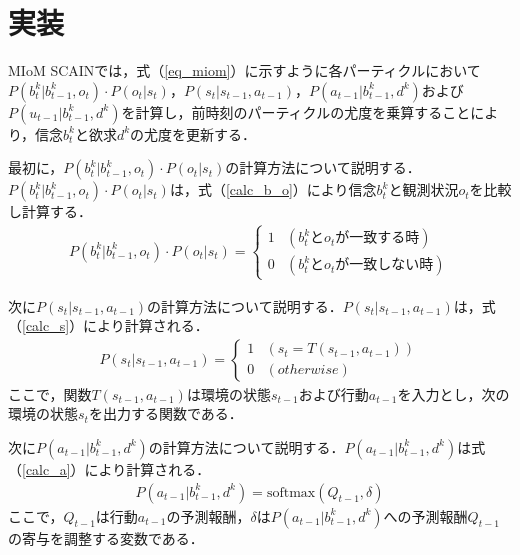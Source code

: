 \section{実装}
\par
MIoM SCAINでは，式（\ref{eq_miom}）に示すように各パーティクルにおいて$P(b_t^k|b_{t-1}^k,o_t)\cdot P(o_t|s_t)$，$P(s_t|s_{t-1},a_{t-1})$，$P(a_{t-1}|b_{t-1}^k,d^k)$および$P(u_{t-1}|b_{t-1}^k,d^k)$を計算し，前時刻のパーティクルの尤度を乗算することにより，信念$b_t^k$と欲求$d^k$の尤度を更新する．

\par
最初に，$P(b_t^k|b_{t-1}^k,o_t)\cdot P(o_t|s_t)$の計算方法について説明する．$P(b_t^k|b_{t-1}^k,o_t)\cdot P(o_t|s_t)$は，式（\ref{calc_b_o}）により信念$b_t^k$と観測状況$o_t$を比較し計算する．
\begin{equation}
  \begin{split}
  \label{calc_b_o}
  P(b_t^k|b_{t-1}^k,o_t)\cdot P(o_t|s_t)=
  \begin{cases}
    1 & (b_t^kとo_tが一致する時) \\
    0 & (b_t^kとo_tが一致しない時)
  \end{cases}
  \end{split}
\end{equation}

\par
次に$P(s_t|s_{t-1},a_{t-1})$の計算方法について説明する．$P(s_t|s_{t-1},a_{t-1})$は，式（\ref{calc_s}）により計算される．
\begin{equation}
  \begin{split}
  \label{calc_s}
  P(s_t|s_{t-1},a_{t-1})=
  \begin{cases}
    1 & (s_t=T(s_{t-1},a_{t-1})) \\
    0 & (otherwise)
  \end{cases}
  \end{split}
\end{equation}
ここで，関数$T(s_{t-1},a_{t-1})$は環境の状態$s_{t-1}$および行動$a_{t-1}$を入力とし，次の環境の状態$s_t$を出力する関数である．

\par
次に$P(a_{t-1}|b_{t-1}^k,d^k)$の計算方法について説明する．$P(a_{t-1}|b_{t-1}^k,d^k)$は式（\ref{calc_a}）により計算される．
\begin{equation}
  \begin{split}
  \label{calc_a}
  P(a_{t-1}|b_{t-1}^k,d^k)=\mathrm{softmax}(Q_{t-1},\delta)
  \end{split}
\end{equation}
ここで，$Q_{t-1}$は行動$a_{t-1}$の予測報酬，$\delta$は$P(a_{t-1}|b_{t-1}^k,d^k)$への予測報酬$Q_{t-1}$の寄与を調整する変数である．

